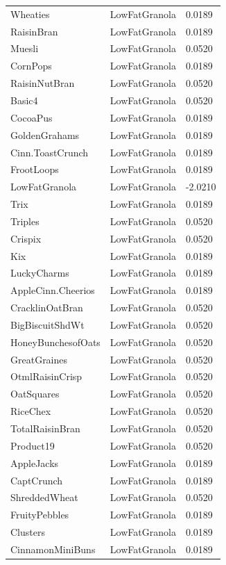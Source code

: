 \begin{table}[!htbp]
\begin{tabular}{lll}
\\
Wheaties & LowFatGranola & 0.0189
\\
RaisinBran & LowFatGranola & 0.0189
\\
Muesli & LowFatGranola & 0.0520
\\
CornPops & LowFatGranola & 0.0189
\\
RaisinNutBran & LowFatGranola & 0.0520
\\
Basic4 & LowFatGranola & 0.0520
\\
CocoaPus & LowFatGranola & 0.0189
\\
GoldenGrahams & LowFatGranola & 0.0189
\\
Cinn.ToastCrunch & LowFatGranola & 0.0189
\\
FrootLoops & LowFatGranola & 0.0189
\\
LowFatGranola & LowFatGranola & -2.0210
\\
Trix & LowFatGranola & 0.0189
\\
Triples & LowFatGranola & 0.0520
\\
Crispix & LowFatGranola & 0.0520
\\
Kix & LowFatGranola & 0.0189
\\
LuckyCharms & LowFatGranola & 0.0189
\\
AppleCinn.Cheerios & LowFatGranola & 0.0189
\\
CracklinOatBran & LowFatGranola & 0.0520
\\
BigBiscuitShdWt & LowFatGranola & 0.0520
\\
HoneyBunchesofOats & LowFatGranola & 0.0520
\\
GreatGraines & LowFatGranola & 0.0520
\\
OtmlRaisinCrisp & LowFatGranola & 0.0520
\\
OatSquares & LowFatGranola & 0.0520
\\
RiceChex & LowFatGranola & 0.0520
\\
TotalRaisinBran & LowFatGranola & 0.0520
\\
Product19 & LowFatGranola & 0.0520
\\
AppleJacks & LowFatGranola & 0.0189
\\
CaptCrunch & LowFatGranola & 0.0189
\\
ShreddedWheat & LowFatGranola & 0.0520
\\
FruityPebbles & LowFatGranola & 0.0189
\\
Clusters & LowFatGranola & 0.0189
\\
CinnamonMiniBuns & LowFatGranola & 0.0189
\\

\end{tabular}
\end{table}
